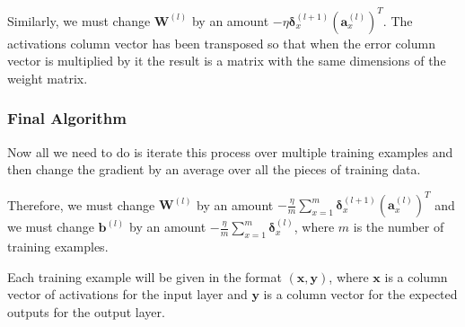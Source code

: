\documentclass[12pt]{report}
\begin{document}
Similarly, we must change $\mathbf{W}^{\left(l\right)}$ by an amount $-\eta \bm{\delta}^{\left(l+1\right)}_x{\left(\mathbf{a}^{\left(l\right)}_x\right)}^T$. The activations column vector has been transposed so that when the error column vector is multiplied by it the result is a matrix with the same dimensions of the weight matrix.

\subsubsection{Final Algorithm}
Now all we need to do is iterate this process over multiple training examples and then change the gradient by an average over all the pieces of training data.

Therefore, we must change $\mathbf{W}^{\left(l\right)}$ by an amount $-\frac{\eta}{m}\displaystyle\sum_{x=1}^{m}\bm{\delta}^{\left(l+1\right)}_x{\left(\mathbf{a}^{\left(l\right)}_x\right)}^T$ and we must change $\mathbf{b}^{\left(l\right)}$ by an amount $-\frac{\eta}{m}\displaystyle\sum_{x=1}^{m}\bm{\delta}^{\left(l\right)}_x$, where $m$ is the number of training examples.

Each training example will be given in the format $\left(\mathbf{x},\mathbf{y}\right)$, where $\mathbf{x}$ is a column vector of activations for the input layer and $\mathbf{y}$ is a column vector for the expected outputs for the output layer.
\end{document}

